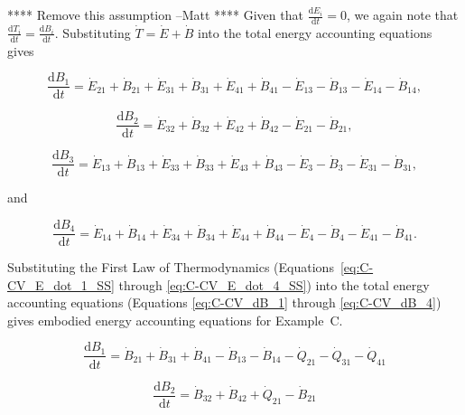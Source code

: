 **** Remove this assumption --Matt **** 
Given that $\frac{\mathrm{d}E_{i}}{\mathrm{d}t} = 0$, 
we again note that 
$\frac{\mathrm{d}T_i}{\mathrm{d}t} = \frac{\mathrm{d}B_i}{\mathrm{d}t}$. 
Substituting $\dot{T} = \dot{E} + \dot{B}$ 
into the total energy accounting equations gives

\begin{equation} \label{eq:C-CV_dB_1}
	\frac{\mathrm{d}B_{1}}{\mathrm{d}t} 	 
	= \dot{E}_{21} 
	+ \dot{B}_{21} 
	+ \dot{E}_{31} 
	+ \dot{B}_{31} 
	+ \dot{E}_{41} 
	+ \dot{B}_{41} 
	- \dot{E}_{13} 
	- \dot{B}_{13} 
	- \dot{E}_{14} 
	- \dot{B}_{14},
\end{equation}

\begin{equation} \label{eq:C-CV_dB_2}
	\frac{\mathrm{d}B_{2}}{\mathrm{d}t} 	 
	= \dot{E}_{32} 
	+ \dot{B}_{32} 
	+ \dot{E}_{42} 
	+ \dot{B}_{42} 
	- \dot{E}_{21} 
	- \dot{B}_{21},
\end{equation}

\begin{equation} \label{eq:C-CV_dB_3}
	\frac{\mathrm{d}B_{3}}{\mathrm{d}t} 	 
	= \dot{E}_{13} 
	+ \dot{B}_{13} 
	+ \dot{E}_{33} 
	+ \dot{B}_{33} 
	+ \dot{E}_{43} 
	+ \dot{B}_{43} 
	- \dot{E}_{3} 
	- \dot{B}_{3} 
	- \dot{E}_{31} 
	- \dot{B}_{31},
\end{equation}

\noindent and 

\begin{equation} \label{eq:C-CV_dB_4}
	\frac{\mathrm{d}B_{4}}{\mathrm{d}t} 	 
	= \dot{E}_{14} 
	+ \dot{B}_{14} 
	+ \dot{E}_{34} 
	+ \dot{B}_{34}
	+ \dot{E}_{44} 
	+ \dot{B}_{44} 
	- \dot{E}_{4} 
	- \dot{B}_{4} 
	- \dot{E}_{41} 
	- \dot{B}_{41}.
\end{equation}

Substituting the First Law of Thermodynamics 
(Equations~\ref{eq:C-CV_E_dot_1_SS} through \ref{eq:C-CV_E_dot_4_SS}) 
into the total energy accounting equations 
(Equations \ref{eq:C-CV_dB_1} through \ref{eq:C-CV_dB_4}) 
gives embodied energy accounting equations for Example~C.

\begin{equation} \label{eq:C-embodied_acct_1}
	\frac{\mathrm{d}B_{1}}{\mathrm{d}t} 	 
	= \dot{B}_{21} 
	+ \dot{B}_{31} 
	+ \dot{B}_{41} 
	- \dot{B}_{13} 
	- \dot{B}_{14} 
	- \dot{Q}_{21} 
	- \dot{Q}_{31} 
	- \dot{Q}_{41}
\end{equation}

\begin{equation} \label{eq:C-embodied_acct_2}
	\frac{\mathrm{d}B_{2}}{\mathrm{d}t} 	 
	= \dot{B}_{32} 
	+ \dot{B}_{42} 
	+ \dot{Q}_{21} 
	- \dot{B}_{21}
\end{equation}

